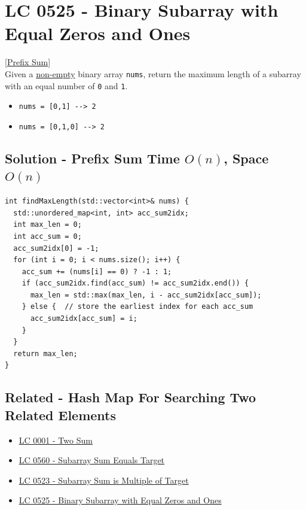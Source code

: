 \section{LC 0525 - Binary Subarray with Equal Zeros and Ones}\label{lc0525}
\hyperref[sec:prefix_sum]{[Prefix Sum]}\\

Given a \ul{non-empty} binary array {\colorbox{CodeBackground}{\lstinline|nums|}}, return the maximum length of a subarray with an equal number of {\colorbox{CodeBackground}{\lstinline|0|}} and {\colorbox{CodeBackground}{\lstinline|1|}}.\\

\begin{itemize}
\item {\colorbox{CodeBackground}{\lstinline|nums = [0,1] --> 2|}}
\item {\colorbox{CodeBackground}{\lstinline|nums = [0,1,0] --> 2|}}
\end{itemize}

\subsection*{Solution - Prefix Sum {\scriptsize\color{gray}\Coffeecup\hspace{1mm}Time $O(n)$, Space $O(n)$}}
\begin{lstlisting}
int findMaxLength(std::vector<int>& nums) {
  std::unordered_map<int, int> acc_sum2idx;
  int max_len = 0;
  int acc_sum = 0;
  acc_sum2idx[0] = -1;
  for (int i = 0; i < nums.size(); i++) {
    acc_sum += (nums[i] == 0) ? -1 : 1;
    if (acc_sum2idx.find(acc_sum) != acc_sum2idx.end()) {
      max_len = std::max(max_len, i - acc_sum2idx[acc_sum]);
    } else {  // store the earliest index for each acc_sum
      acc_sum2idx[acc_sum] = i;
    }
  }
  return max_len;
}
\end{lstlisting}

\subsection*{Related - Hash Map For Searching Two Related Elements}
\begin{itemize}
\item \hyperref[lc0001]{LC 0001 - Two Sum}
\item \hyperref[lc0560]{LC 0560 - Subarray Sum Equals Target}
\item \hyperref[lc0523]{LC 0523 - Subarray Sum is Multiple of Target}
\item \hyperref[lc0525]{LC 0525 - Binary Subarray with Equal Zeros and Ones}
\end{itemize}

